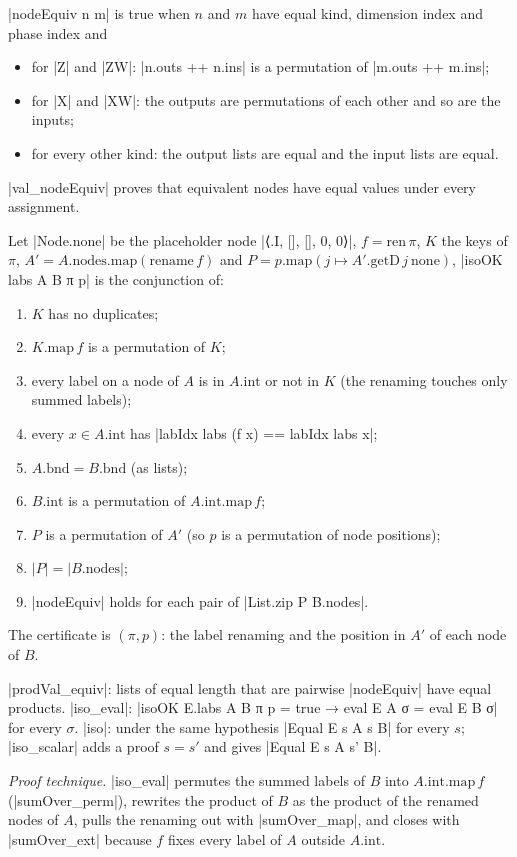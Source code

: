\begin{definition}
\lean|nodeEquiv n m| is true when $n$ and $m$ have equal kind, dimension index and phase index and
\begin{itemize}
\item for \lean|Z| and \lean|ZW|: \lean|n.outs ++ n.ins| is a permutation of \lean|m.outs ++ m.ins|;
\item for \lean|X| and \lean|XW|: the outputs are permutations of each other and so are the inputs;
\item for every other kind: the output lists are equal and the input lists are equal.
\end{itemize}
\lean|val_nodeEquiv| proves that equivalent nodes have equal values under every assignment.
\end{definition}

\begin{definition}
Let \lean|Node.none| be the placeholder node \lean|⟨.I, [], [], 0, 0⟩|, $f=\mathrm{ren}\,\pi$, $K$ the keys of $\pi$,
$A'=A.\mathrm{nodes}.\mathrm{map}(\mathrm{rename}\,f)$ and $P=p.\mathrm{map}(j\mapsto
A'.\mathrm{getD}\,j\ \mathrm{none})$, \lean|isoOK labs A B π p| is the conjunction of:
\begin{enumerate}
\item $K$ has no duplicates;
\item $K.\mathrm{map}\,f$ is a permutation of $K$;
\item every label on a node of $A$ is in $A.\mathrm{int}$ or not in $K$ (the renaming touches only
  summed labels);
\item every $x\in A.\mathrm{int}$ has \lean|labIdx labs (f x) == labIdx labs x|;
\item $A.\mathrm{bnd}=B.\mathrm{bnd}$ (as lists);
\item $B.\mathrm{int}$ is a permutation of $A.\mathrm{int}.\mathrm{map}\,f$;
\item $P$ is a permutation of $A'$ (so $p$ is a permutation of node positions);
\item $|P|=|B.\mathrm{nodes}|$;
\item \lean|nodeEquiv| holds for each pair of \lean|List.zip P B.nodes|.
\end{enumerate}
The certificate is $(\pi,p)$: the label renaming and the position in $A'$ of each node of $B$.
\end{definition}

\begin{theorem}
\lean|prodVal_equiv|: lists of equal length that are pairwise \lean|nodeEquiv| have equal products.
\lean|iso_eval|: \lean|isoOK E.labs A B π p = true → eval E A σ = eval E B σ| for every $\sigma$.
\lean|iso|: under the same hypothesis \lean|Equal E s A s B| for every $s$; \lean|iso_scalar| adds a
proof $s=s'$ and gives \lean|Equal E s A s' B|.
\end{theorem}
\emph{Proof technique.} \lean|iso_eval| permutes the summed labels of $B$ into $A.\mathrm{int}.\mathrm{map}\,f$
(\lean|sumOver_perm|), rewrites the product of $B$ as the product of the renamed nodes of $A$,
pulls the renaming out with \lean|sumOver_map|, and closes with \lean|sumOver_ext| because $f$ fixes
every label of $A$ outside $A.\mathrm{int}$.

